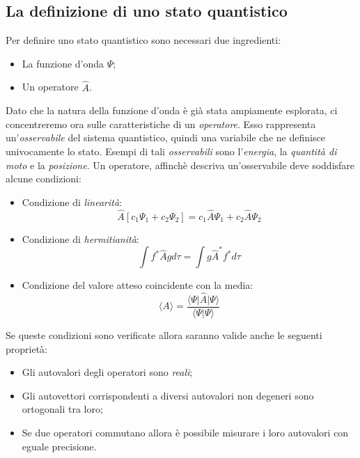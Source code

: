 \documentclass[oneside]{amsbook}
\numberwithin{section}{chapter}
\numberwithin{equation}{section}
\numberwithin{figure}{section}
\begin{document}
\subsection{La definizione di uno stato quantistico} 
Per definire uno stato quantistico sono necessari due ingredienti:
\begin{itemize}
\item La funzione d'onda $\Psi$;
\item Un operatore $\hat{A}$.
\end{itemize}
Dato che la natura della funzione d'onda è già stata ampiamente esplorata, ci concentreremo ora sulle caratteristiche di un \emph{operatore}. Esso rappresenta un'\emph{osservabile} del sistema quantistico, quindi una variabile che ne definisce univocamente lo stato. Esempi di tali \emph{osservabili} sono l'\emph{energia}, la \emph{quantità di moto} e la \emph{posizione}.
Un operatore, affinchè descriva un'osservabile deve soddisfare alcune condizioni:
\begin{itemize}
\item Condizione di \emph{linearità}: $$\hat{A}[c_1\Psi_1+c_2\Psi_2]=c_1 \hat{A}\Psi_1 +c_2 \hat{A}\Psi_2 $$
\item Condizione di \emph{hermitianità}:
$$ \int f^*\hat{A}gd\tau=\int g\hat{A}^*f^*d\tau$$
\item Condizione del valore atteso coincidente con la media:
$$\langle A\rangle=\frac{\langle\Psi\vert\hat{A}\vert\Psi\rangle}{\langle\Psi\vert\Psi\rangle} $$ 
\end{itemize} 
Se queste condizioni sono verificate allora saranno valide anche le seguenti proprietà:
\begin{itemize}
\item Gli autovalori degli operatori sono \emph{reali};
\item Gli autovettori corrispondenti a diversi autovalori non degeneri sono ortogonali tra loro;
\item Se due operatori commutano allora è possibile misurare i loro autovalori con eguale precisione.
\end{itemize}
\end{document}
